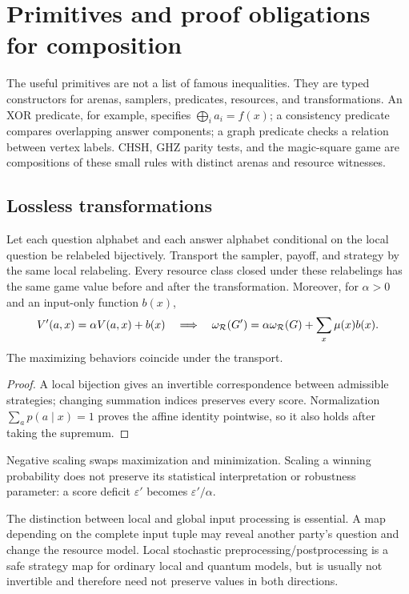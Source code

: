 \section{Primitives and proof obligations for composition}
\label{sec:composition}

The useful primitives are not a list of famous inequalities. They are typed
constructors for arenas, samplers, predicates, resources, and transformations.
An XOR predicate, for example, specifies
$\bigoplus_i a_i=f(x)$; a consistency predicate compares overlapping answer
components; a graph predicate checks a relation between vertex labels. CHSH,
GHZ parity tests, and the magic-square game are compositions of these small
rules with distinct arenas and resource witnesses.

\subsection{Lossless transformations}
\begin{proposition}
Let each question alphabet and each answer alphabet conditional on the local
question be relabeled bijectively. Transport the sampler, payoff, and strategy
by the same local relabeling. Every resource class closed under these
relabelings has the same game value before and after the transformation.
Moreover, for $\alpha>0$ and an input-only function $b(x)$,
\[
 V'(a,x)=\alpha V(a,x)+b(x)
 \quad\Longrightarrow\quad
 \omega_{\mathcal R}(G')=\alpha\omega_{\mathcal R}(G)
 +\sum_x\mu(x)b(x).
\]
The maximizing behaviors coincide under the transport.
\end{proposition}
\begin{proof}
A local bijection gives an invertible correspondence between admissible
strategies; changing summation indices preserves every score. Normalization
$\sum_a p(a\mid x)=1$ proves the affine identity pointwise, so it also holds
after taking the supremum.
\end{proof}
Negative scaling swaps maximization and minimization. Scaling a winning
probability does not preserve its statistical interpretation or robustness
parameter: a score deficit $\varepsilon'$ becomes $\varepsilon'/\alpha$.

The distinction between local and global input processing is essential. A
map depending on the complete input tuple may reveal another party's question
and change the resource model. Local stochastic preprocessing/postprocessing
is a safe strategy map for ordinary local and quantum models, but is usually
not invertible and therefore need not preserve values in both directions.

